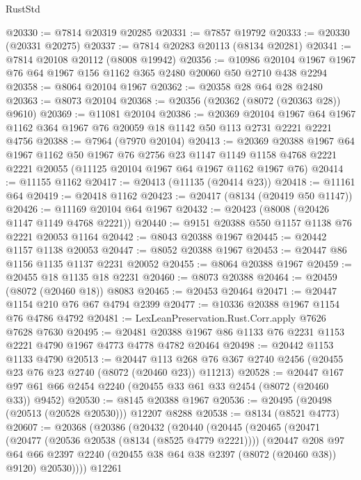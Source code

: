 \begin{lexlean}{RustStd}
\begin{coremodule}
{\begin{coremodule}
{{{{{{{{{{{{{{{{{{{{{{{{{{{{{{{{{{{{{{{{{{{{{{{{{{{{{@20330 := @7814 @20319 @20285
@20331 := @7857 @19792
@20333 := @20330 (@20331 @20275)
@20337 := @7814 @20283 @20113 (@8134 @20281)
@20341 := @7814 @20108 @20112 (@8008 @19942)
@20356 := @10986 @20104 @1967 @1967 @76 @64 @1967 @156 @1162 @365 @2480 @20060 @50 @2710 @438 @2294
@20358 := @8064 @20104 @1967
@20362 := @20358 @28 @64 @28 @2480
@20363 := @8073 @20104
@20368 := @20356 (@20362 (@8072 (@20363 @28)) @9610)
@20369 := @11081 @20104
@20386 := @20369
    @20104
    @1967
    @64
    @1967
    @1162
    @364
    @1967
    @76
    @20059
    @18
    @1142
    @50
    @113
    @2731
    @2221
    @2221
    @4756
@20388 := @7964 (@7970 @20104)
@20413 := @20369
    @20388
    @1967
    @64
    @1967
    @1162
    @50
    @1967
    @76
    @2756
    @23
    @1147
    @1149
    @1158
    @4768
    @2221
    @2221
    @20055
    (@11125 @20104 @1967 @64 @1967 @1162 @1967 @76)
@20414 := @11155 @1162
@20417 := @20413 (@11135 (@20414 @23))
@20418 := @11161 @64
@20419 := @20418 @1162
@20423 := @20417 (@8134 (@20419 @50 @1147))
@20426 := @11169 @20104 @64 @1967
@20432 := @20423 (@8008 (@20426 @1147 @1149 @4768 @2221))
@20440 := @9151 @20388 @550 @1157 @1138 @76 @2221 @20053 @1164
@20442 := @8043 @20388 @1967
@20445 := @20442 @1157 @1138 @20053
@20447 := @8052 @20388 @1967
@20453 := @20447 @86 @1156 @1135 @1137 @2231 @20052
@20455 := @8064 @20388 @1967
@20459 := @20455 @18 @1135 @18 @2231
@20460 := @8073 @20388
@20464 := @20459 (@8072 (@20460 @18)) @8083
@20465 := @20453 @20464
@20471 := @20447 @1154 @210 @76 @67 @4794 @2399
@20477 := @10336 @20388 @1967 @1154 @76 @4786 @4792
@20481 := LexLeanPreservation.Rust.Corr.apply @7626 @7628 @7630
@20495 := @20481 @20388 @1967 @86 @1133 @76 @2231 @1153 @2221 @4790 @1967 @4773 @4778 @4782 @20464
@20498 := @20442 @1153 @1133 @4790
@20513 := @20447
    @113
    @268
    @76
    @367
    @2740
    @2456
    (@20455 @23 @76 @23 @2740 (@8072 (@20460 @23)) @11213)
@20528 := @20447 @167 @97 @61 @66 @2454 @2240 (@20455 @33 @61 @33 @2454 (@8072 (@20460 @33)) @9452)
@20530 := @8145 @20388 @1967
@20536 := @20495 (@20498 (@20513 (@20528 @20530))) @12207 @8288
@20538 := @8134 (@8521 @4773)
@20607 := @20368
    (@20386
      (@20432
        (@20440
          (@20445
            (@20465
              (@20471
                (@20477 (@20536 @20538 (@8134 (@8525 @4779 @2221))))
                (@20447
                  @208
                  @97
                  @64
                  @66
                  @2397
                  @2240
                  (@20455 @38 @64 @38 @2397 (@8072 (@20460 @38)) @9120)
                  @20530))))
          @12261
}}}}}}}}}}}}}}}}}}}}}}}}}}}}}}}}}}}}}}}}}}}}}}}}}}}}}
\end{coremodule}}
\end{coremodule}
\end{lexlean}
